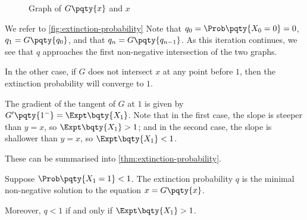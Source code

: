 \begin{figure}[ht!]

    \caption{Graph of \(G\pqty{x}\) and \(x\)}
    \label{fig:extinction-probability}
\end{figure}

We refer to \autoref{fig:extinction-probability} Note that \(q_0 = \Prob\pqty{X_0 = 0} = 0\), \(q_1 = G\pqty{q_0}\), and that \(q_n = G\pqty{q_{n - 1}}\). As this iteration continues, we see that \(q\) approaches the first non-negative intersection of the two graphs.

In the other case, if \(G\) does not intersect \(x\) at any point before \(1\), then the extinction probability will converge to \(1\).

The gradient of the tangent of \(G\) at \(1\) is given by \(G'\pqty{1^-} = \Expt\bqty{X_1}\). Note that in the first case, the slope is steeper than \(y = x\), so \(\Expt\bqty{X_1} > 1\); and in the second case, the slope is shallower than \(y = x\), so \(\Expt\bqty{X_1} < 1\).

These can be summarised into \autoref{thm:extinction-probability}.

\begin{theorem}
    \label{thm:extinction-probability}%
    Suppose \(\Prob\pqty{X_1 = 1} < 1\). The extinction probability \(q\) is the minimal non-negative solution to the equation \(x = G\pqty{x}\).

    Moreover, \(q < 1\) if and only if \(\Expt\bqty{X_1} > 1\).
\end{theorem}


